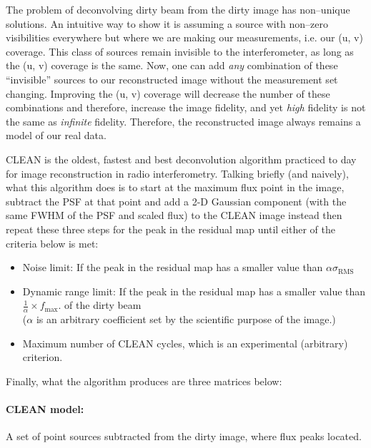 \documentclass[paper=a4, fontsize=11pt]{scrartcl} %
\numberwithin{equation}{section} %
\numberwithin{figure}{section} %
\numberwithin{table}{section} %
\begin{document}
The problem of deconvolving dirty beam from the dirty image has non--unique solutions. An intuitive way to show it is assuming a source with non--zero visibilities everywhere but where we are making our measurements, i.e. our (u, v) coverage. This class of sources remain invisible to the interferometer, as long as the (u, v) coverage is the same. Now, one can add \emph{any} combination of these ``invisible'' sources to our reconstructed image without the measurement set changing. Improving the (u, v) coverage will decrease the number of these combinations and therefore, increase the image fidelity, and yet \emph{high} fidelity is not the same as \emph{infinite} fidelity. Therefore, the reconstructed image always remains a model of our real data.

CLEAN \citep[][]{Hogbom1974} is the oldest, fastest and best deconvolution algorithm practiced to day for image reconstruction in radio interferometry. Talking briefly (and naively), what this algorithm does is to start at the maximum flux point in the image, subtract the PSF at that point and add a 2-D Gaussian component (with the same FWHM of the PSF and scaled flux) to the CLEAN image instead then repeat these three steps for the peak in the residual map until either of the criteria below is met: 
\begin{itemize}
\item Noise limit: If the peak in the residual map has a smaller value than $\alpha \sigma_\mathrm{RMS}$ 
\item Dynamic range limit: If the peak in the residual map has a smaller value than $\frac{1}{\alpha} \times f_\mathrm{max}$. of the dirty beam
\\($\alpha$ is an arbitrary coefficient set by the scientific purpose of the image.)
\item Maximum number of CLEAN cycles, which is an experimental (arbitrary) criterion.
\end{itemize}


Finally, what the algorithm produces are three matrices below:
\paragraph*{CLEAN model:} A set of point sources subtracted from the dirty image, where flux peaks located.
\end{document}
